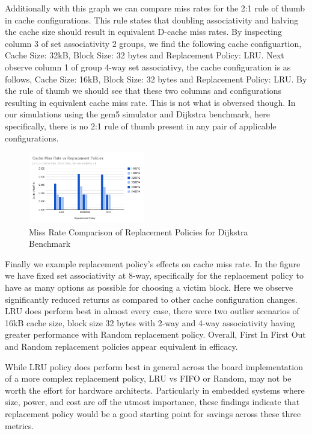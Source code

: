 \documentclass[conference]{IEEEtran}
\begin{document}
Additionally with this graph we can compare miss rates for the 2:1 rule of thumb in cache configurations. This rule states that doubling associativity and halving the cache size should result in equivalent D-cache miss rates. By inspecting column 3 of set associativity 2 groups, we find the following cache configuartion, Cache Size: 32kB, Block Size: 32 bytes and Replacement Policy: LRU. Next observe column 1 of group 4-way set associativy, the cache configuration is as follows, Cache Size: 16kB, Block Size: 32 bytes and Replacement Policy: LRU. By the rule of thumb we should see that these two columns and configurations resulting in equivalent cache miss rate. This is not what is obversed though. In our simulations using the gem5 simulator and Dijkstra benchmark, here specifically, there is no 2:1 rule of thumb present in any pair of applicable configurations.

\begin{figure}[H]
  \centering
  \includegraphics[width=0.45\textwidth]{dijkstraFigures/CacheMissRatevsReplacementPolicies.png}
  \caption{Miss Rate Comparison of Replacement Policies for Dijkstra Benchmark}
  \label{fig:MissRateVsReplPolicy}
\end{figure}

Finally we example replacement policy's effects on cache miss rate. In the figure we have fixed set associativity at 8-way, specifically for the replacement policy to have as many options as possible for choosing a victim block. Here we observe significantly reduced returns as compared to other cache configuration changes. LRU does perform best in almost every case, there were two outlier scenarios of 16kB cache size, block size 32 bytes with 2-way and 4-way associativity having greater performance with Random replacement policy. Overall, First In First Out and Random replacement policies appear equivalent in efficacy. 

While LRU policy does perform best in general across the board implementation of a more complex replacement policy, LRU vs FIFO or Random, may not be worth the effort for hardware architects. Particularly in embedded systems where size, power, and cost are off the utmost importance, these findings indicate that replacement policy would be a good starting point for savings across these three metrics.
\end{document}
